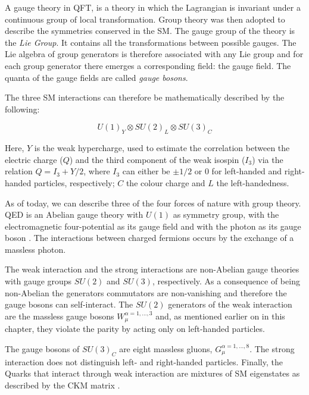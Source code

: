 			A gauge theory in QFT, is a theory in which the Lagrangian is invariant under a continuous group of local transformation. Group theory was then adopted to describe the symmetries conserved in the SM.  
			The gauge group of the theory is the \emph{Lie Group}. It contains all the transformations between possible gauges. The Lie algebra of group generators is therefore associated with any Lie group and for each group generator there emerges a corresponding field: the gauge field. The quanta of the gauge fields are called \emph{gauge bosons}.
			
			The three SM interactions can therefore be mathematically described by the following:

			\begin{equation}
			\label{eq:SM_gaugeSym}
				U(1)_Y \otimes SU(2)_L \otimes SU(3)_C
			\end{equation}

			\noindent Here, $Y$ is the weak hypercharge, used to estimate the correlation between the electric charge ($Q$) and the third component of the weak isospin ($I_3$) via the relation $Q = I_3 + Y/2$, where $I_3$ can either be $\pm 1/2$ or $0$ for left-handed and right-handed particles, respectively; $C$ the colour charge and $L$ the left-handedness. 

			As of today, we can describe three of the four forces of nature with group theory. QED is an Abelian gauge theory with $U(1)$ as symmetry group, with the electromagnetic four-potential as its gauge field and with the photon as its gauge boson \cite{Pich2012}. The interactions between charged fermions occurs by the exchange of a massless photon. 

			The weak interaction and the strong interactions are non-Abelian gauge theories with gauge groups $SU(2)$ and $SU(3)$, respectively. As a consequence of being non-Abelian the generators commutators are non-vanishing and therefore the gauge bosons can self-interact. The $SU(2)$ generators of the weak interaction are the massless gauge bosons $W_{\mu}^{\alpha = 1,\dots,3}$ and, as mentioned earlier on in this chapter, they violate the parity by acting only on left-handed particles. 

			The gauge bosons of $SU(3)_C$ are eight massless gluons, $G_{\mu}^{\alpha=1,\dots,8}$. The strong interaction does not distinguish left- and right-handed particles. 
			Finally, the Quarks that interact through weak interaction are mixtures of SM eigenstates as described by the CKM matrix \cite{Olive2014}.



